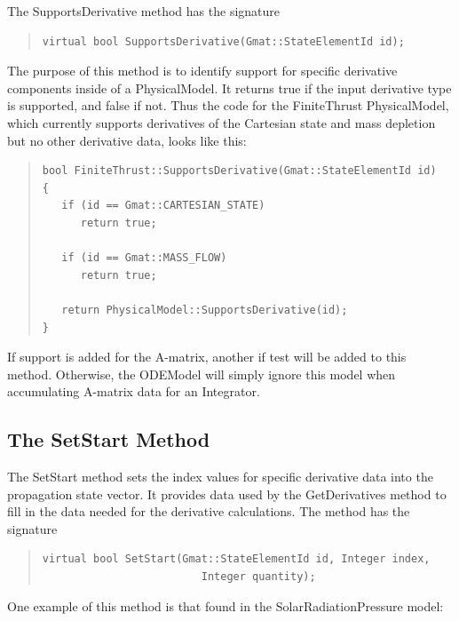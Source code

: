 \documentclass[letterpaper,10pt]{article}
\begin{document}
The SupportsDerivative method has the signature

\begin{quote}
\begin{verbatim}
virtual bool SupportsDerivative(Gmat::StateElementId id);
\end{verbatim}
\end{quote}

\noindent The purpose of this method is to identify support for specific
derivative components inside of a PhysicalModel.  It returns true if the input
derivative type is supported, and false if not.  Thus the code for the
FiniteThrust PhysicalModel, which currently supports derivatives of the
Cartesian state and mass depletion but no other derivative data, looks like
this:

\begin{quote}
\begin{verbatim}
bool FiniteThrust::SupportsDerivative(Gmat::StateElementId id)
{
   if (id == Gmat::CARTESIAN_STATE)
      return true;
   
   if (id == Gmat::MASS_FLOW)
      return true;
   
   return PhysicalModel::SupportsDerivative(id);
}
\end{verbatim}
\end{quote}

\noindent If support is added for the A-matrix, another if test will be added
to this method.  Otherwise, the ODEModel will simply ignore this model when
accumulating A-matrix data for an Integrator.

\subsection{The SetStart Method}

The SetStart method sets the index values for specific derivative data into the
propagation state vector.  It provides data used by the GetDerivatives method
to fill in the data needed for the derivative calculations.  The method has the
signature

\begin{quote}
\begin{verbatim}
virtual bool SetStart(Gmat::StateElementId id, Integer index, 
                         Integer quantity);
\end{verbatim}
\end{quote}

\noindent One example of this method is that found in the
SolarRadiationPressure model:
\end{document}
